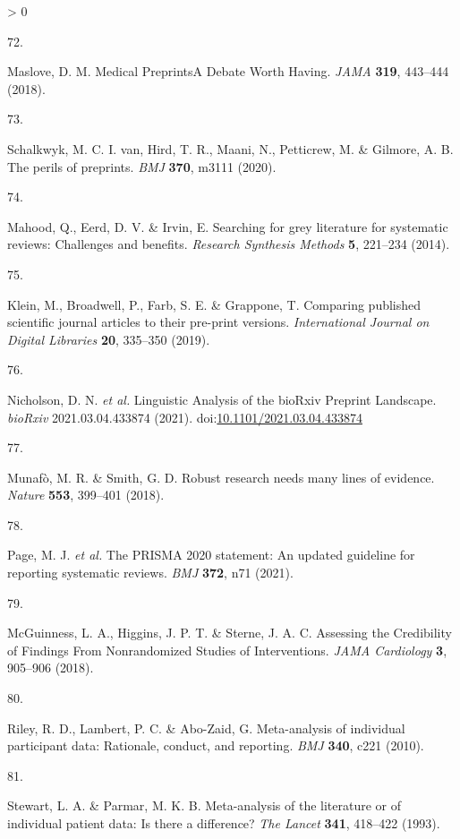 \documentclass[a4paper, twoside]{templates/ociamthesis}
\newlength{\cslhangindent}
\newlength{\csllabelwidth}
\newenvironment{CSLReferences}[3] %
 {%
  \setlength{\parindent}{0pt}
  \ifodd #1 \everypar{\setlength{\hangindent}{\cslhangindent}}\ignorespaces\fi
  \ifnum #2 > 0
  \setlength{\parskip}{#2\baselineskip}
  \fi
 }%
 {}
\newcommand{\CSLLeftMargin}[1]{\parbox[t]{\maxof{\widthof{#1}}{\csllabelwidth}}{#1}}
\newcommand{\CSLRightInline}[1]{\parbox[t]{\linewidth - \csllabelwidth}{#1}}
\begin{document}
\begin{CSLReferences}{0}{0}
\leavevmode\hypertarget{ref-maslove2018}{}%
\CSLLeftMargin{72. }
\CSLRightInline{Maslove, D. M. Medical {Preprints}{{A Debate Worth Having}}. \emph{JAMA} \textbf{319}, 443--444 (2018).}

\leavevmode\hypertarget{ref-schalkwyk2020}{}%
\CSLLeftMargin{73. }
\CSLRightInline{Schalkwyk, M. C. I. van, Hird, T. R., Maani, N., Petticrew, M. \& Gilmore, A. B. The perils of preprints. \emph{BMJ} \textbf{370}, m3111 (2020).}

\leavevmode\hypertarget{ref-mahood2014}{}%
\CSLLeftMargin{74. }
\CSLRightInline{Mahood, Q., Eerd, D. V. \& Irvin, E. Searching for grey literature for systematic reviews: Challenges and benefits. \emph{Research Synthesis Methods} \textbf{5}, 221--234 (2014).}

\leavevmode\hypertarget{ref-klein2019}{}%
\CSLLeftMargin{75. }
\CSLRightInline{Klein, M., Broadwell, P., Farb, S. E. \& Grappone, T. Comparing published scientific journal articles to their pre-print versions. \emph{International Journal on Digital Libraries} \textbf{20}, 335--350 (2019).}

\leavevmode\hypertarget{ref-nicholson2021}{}%
\CSLLeftMargin{76. }
\CSLRightInline{Nicholson, D. N. \emph{et al.} Linguistic {Analysis} of the {bioRxiv Preprint Landscape}. \emph{bioRxiv} 2021.03.04.433874 (2021). doi:\href{https://doi.org/10.1101/2021.03.04.433874}{10.1101/2021.03.04.433874}}

\leavevmode\hypertarget{ref-munafo2018}{}%
\CSLLeftMargin{77. }
\CSLRightInline{Munafò, M. R. \& Smith, G. D. Robust research needs many lines of evidence. \emph{Nature} \textbf{553}, 399--401 (2018).}

\leavevmode\hypertarget{ref-page2021}{}%
\CSLLeftMargin{78. }
\CSLRightInline{Page, M. J. \emph{et al.} The {PRISMA} 2020 statement: An updated guideline for reporting systematic reviews. \emph{BMJ} \textbf{372}, n71 (2021).}

\leavevmode\hypertarget{ref-mcguinness2018}{}%
\CSLLeftMargin{79. }
\CSLRightInline{McGuinness, L. A., Higgins, J. P. T. \& Sterne, J. A. C. Assessing the {Credibility} of {Findings From Nonrandomized Studies} of {Interventions}. \emph{JAMA Cardiology} \textbf{3}, 905--906 (2018).}

\leavevmode\hypertarget{ref-riley2010}{}%
\CSLLeftMargin{80. }
\CSLRightInline{Riley, R. D., Lambert, P. C. \& Abo-Zaid, G. Meta-analysis of individual participant data: Rationale, conduct, and reporting. \emph{BMJ} \textbf{340}, c221 (2010).}

\leavevmode\hypertarget{ref-stewart1993}{}%
\CSLLeftMargin{81. }
\CSLRightInline{Stewart, L. A. \& Parmar, M. K. B. Meta-analysis of the literature or of individual patient data: Is there a difference? \emph{The Lancet} \textbf{341}, 418--422 (1993).}


\end{CSLReferences}
\end{document}
